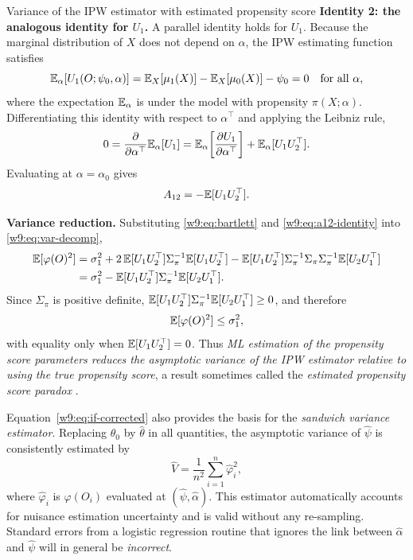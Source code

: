 \documentclass[master.tex]{subfiles}
\begin{document}
\begin{example}{Variance of the IPW estimator with estimated propensity score}
\medskip\noindent\textbf{Identity 2: the analogous identity for $U_1$.}
A parallel identity holds for $U_1$.  Because the marginal
distribution of $X$ does not depend on $\alpha$, the IPW estimating
function satisfies
\[
  \mathbb{E}_\alpha[U_1(O;\psi_0,\alpha)]
  =
  \mathbb{E}_X[\mu_1(X)] - \mathbb{E}_X[\mu_0(X)] - \psi_0
  = 0
  \quad\text{for all }\alpha,
\]
where the expectation $\mathbb{E}_\alpha$ is under the model with propensity
$\pi(X;\alpha)$.  Differentiating this identity with respect to
$\alpha^\top$ and applying the Leibniz rule,
\[
  0
  =
  \frac{\partial}{\partial\alpha^\top}\mathbb{E}_\alpha[U_1]
  =
  \mathbb{E}_{\alpha}\!\left[\frac{\partial U_1}{\partial\alpha^\top}\right]
  +
  \mathbb{E}_{\alpha}[U_1 U_2^\top].
\]
Evaluating at $\alpha = \alpha_0$ gives
\begin{equation}
  A_{12} = -\mathbb{E}[U_1 U_2^\top].
  \label{w9:eq:a12-identity}
\end{equation}

\medskip\noindent\textbf{Variance reduction.}
Substituting \eqref{w9:eq:bartlett} and \eqref{w9:eq:a12-identity}
into \eqref{w9:eq:var-decomp},
\begin{align*}
  \mathbb{E}[\varphi(O)^2]
  &= \sigma_1^2
     + 2\,\mathbb{E}[U_1 U_2^\top]\Sigma_\pi^{-1}\mathbb{E}[U_1 U_2^\top]
     - \mathbb{E}[U_1 U_2^\top]\Sigma_\pi^{-1}\Sigma_\pi
       \Sigma_\pi^{-1}\mathbb{E}[U_2 U_1^\top] \\
  &= \sigma_1^2
     - \mathbb{E}[U_1 U_2^\top]\Sigma_\pi^{-1}\mathbb{E}[U_2 U_1^\top].
\end{align*}
Since $\Sigma_\pi$ is positive definite,
$\mathbb{E}[U_1 U_2^\top]\Sigma_\pi^{-1}\mathbb{E}[U_2 U_1^\top] \geq 0$, and
therefore
\[
  \mathbb{E}[\varphi(O)^2] \leq \sigma_1^2,
\]
with equality only when $\mathbb{E}[U_1 U_2^\top] = 0$.  Thus \emph{ML
estimation of the propensity score parameters reduces the asymptotic
variance of the IPW estimator relative to using the true propensity
score}, a result sometimes called the \emph{estimated propensity score
paradox} \citep{robins1986new}.

\end{example}

\begin{remark}
\label{w9:rem:sandwich}
Equation~\eqref{w9:eq:if-corrected} also provides the basis for the
\emph{sandwich variance estimator}.  Replacing $\theta_0$ by
$\hat\theta$ in all quantities, the asymptotic variance of $\hat\psi$
is consistently estimated by
\[
  \hat V
  =
  \frac{1}{n^2}\sum_{i=1}^n \hat\varphi_i^2,
\]
where $\hat\varphi_i$ is $\varphi(O_i)$ evaluated at
$(\hat\psi,\hat\alpha)$.  This estimator automatically accounts for
nuisance estimation uncertainty and is valid without any re-sampling.
Standard errors from a logistic regression routine that ignores the
link between $\hat\alpha$ and $\hat\psi$ will in general be
\emph{incorrect}.
\end{remark}
\end{document}
